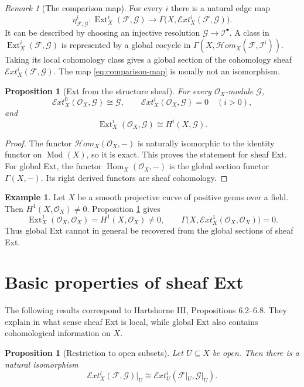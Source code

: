 \documentclass[11pt,a4paper]{article}
\numberwithin{equation}{section}
\theoremstyle{plain}
\newtheorem{proposition}[theorem]{Proposition}
\theoremstyle{definition}
\newtheorem{example}[theorem]{Example}
\theoremstyle{remark}
\newtheorem{remark}[theorem]{Remark}
\newcommand{\OO}{\mathcal O}
\newcommand{\F}{\mathcal F}
\newcommand{\G}{\mathcal G}
\newcommand{\I}{\mathcal I}
\DeclareMathOperator{\Ext}{Ext}
\DeclareMathOperator{\Hom}{Hom}
\newcommand{\sExt}{\mathcal{E}\!xt}
\newcommand{\sHom}{\mathcal{H}\!om}
\newcommand{\Mod}{\operatorname{Mod}}
\begin{document}
\begin{remark}[The comparison map]
For every \(i\) there is a natural edge map
\begin{equation}\label{eq:comparison-map}
  \eta_{\F,\G}^i:
  \Ext_X^i(\F,\G)
  \longrightarrow
  \Gamma\bigl(X,\sExt_X^i(\F,\G)\bigr).
\end{equation}
It can be described by choosing an injective resolution \(\G\to\I^\bullet\).  A class in \(\Ext_X^i(\F,\G)\) is represented by a global cocycle in \(\Gamma(X,\sHom_X(\F,\I^i))\).  Taking its local cohomology class gives a global section of the cohomology sheaf \(\sExt_X^i(\F,\G)\).  The map \eqref{eq:comparison-map} is usually not an isomorphism.
\end{remark}

\begin{proposition}[Ext from the structure sheaf]\label{prop:structure-sheaf}
For every \(\OO_X\)-module \(\G\),
\[
  \sExt_X^0(\OO_X,\G)\cong\G,
  \qquad
  \sExt_X^i(\OO_X,\G)=0\quad (i>0),
\]
and
\[
  \Ext_X^i(\OO_X,\G)\cong H^i(X,\G).
\]
\end{proposition}

\begin{proof}
The functor \(\sHom_X(\OO_X,-)\) is naturally isomorphic to the identity functor on \(\Mod(X)\), so it is exact.  This proves the statement for sheaf Ext.  For global Ext, the functor \(\Hom_X(\OO_X,-)\) is the global section functor \(\Gamma(X,-)\).  Its right derived functors are sheaf cohomology.
\end{proof}

\begin{example}\label{ex:curve}
Let \(X\) be a smooth projective curve of positive genus over a field.  Then \(H^1(X,\OO_X)\ne0\).  Proposition \ref{prop:structure-sheaf} gives
\[
  \Ext_X^1(\OO_X,\OO_X)=H^1(X,\OO_X)\ne0,
  \qquad
  \Gamma\bigl(X,\sExt_X^1(\OO_X,\OO_X)\bigr)=0.
\]
Thus global Ext cannot in general be recovered from the global sections of sheaf Ext.
\end{example}

\section{Basic properties of sheaf Ext}

The following results correspond to Hartshorne III, Propositions 6.2--6.8.  They explain in what sense sheaf Ext is local, while global Ext also contains cohomological information on \(X\).

\begin{proposition}[Restriction to open subsets]\label{prop:restriction}
Let \(U\subseteq X\) be open.  Then there is a natural isomorphism
\[
  \sExt_X^i(\F,\G)|_U
  \cong
  \sExt_U^i(\F|_U,\G|_U).
\]
\end{proposition}
\end{document}
